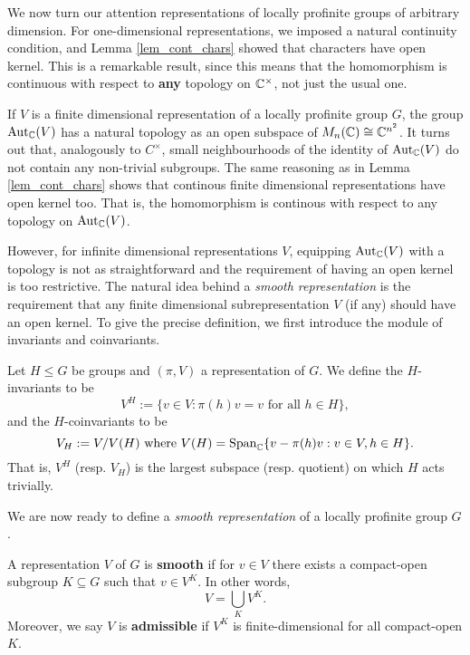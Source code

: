 We now turn our attention representations of locally profinite groups of arbitrary dimension. For one-dimensional representations, we imposed a natural continuity condition, and Lemma \ref{lem_cont_chars} showed that characters have open kernel. This is a remarkable result, since this means that the homomorphism is continuous with respect to \textbf{any} topology on $\mathbb{C}^{\times}$, not just the usual one.

If $V$ is a finite dimensional representation of a locally profinite group $G$, the group $\mathrm{Aut}_{\mathbb{C}}(V)$ has a natural topology as an open subspace of $M_n(\mathbb{C})\cong\mathbb{C}^{n^2}$. It turns out that, analogously to $C^{\times}$, small neighbourhoods of the identity of $\mathrm{Aut}_{\mathbb{C}}(V)$ do not contain any non-trivial subgroups. The same reasoning as in Lemma \ref{lem_cont_chars} shows that continous finite dimensional representations have open kernel too. That is, the homomorphism is continous with respect to any topology on $\mathrm{Aut}_{\mathbb{C}}(V)$.

However, for infinite dimensional representations $V$, equipping $\mathrm{Aut}_{\mathbb{C}}(V)$ with a topology is not as straightforward and the requirement of having an open kernel is too restrictive. The natural idea behind a \textit{smooth representation} is the requirement that any finite dimensional subrepresentation $V$ (if any) should have an open kernel. To give the precise definition, we first introduce the module of invariants and coinvariants.

\begin{defn}
    Let $H\leq G$ be groups and $(\pi,V)$ a representation of $G$. We define the $H$-invariants to be 
    $$V^{H}:=\{v\in V:\pi(h)v=v\text{ for all }h\in H\},$$
    and the $H$-coinvariants to be 
    $$V_H:=V/V(H)\text{ where } V(H)=\textrm{Span}_{\mathbb{C}}\{v-\pi(h)v:v\in V,h\in H\}.$$
    That is, $V^H$ (resp. $V_H$) is the largest subspace (resp. quotient) on which $H$ acts trivially.
\end{defn}

We are now ready to define a \textit{smooth representation} of a locally profinite group $G$.

\begin{defn}
	A representation $V$ of $G$ is \textbf{smooth} if for $v\in V$ there exists a compact-open subgroup $K\subseteq G$ such that $v\in V^K$. In other words,
    $$V=\bigcup_K V^K.$$
    Moreover, we say $V$ is \textbf{admissible} if $V^K$ is finite-dimensional for all compact-open $K$.
\end{defn}

